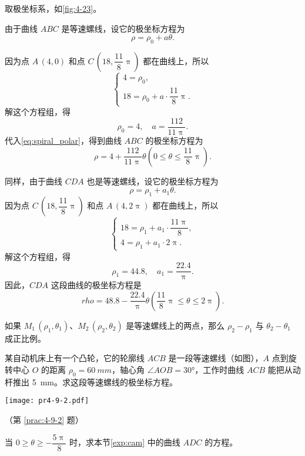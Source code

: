 \begin{solution}
  取极坐标系，如\cref{fig:4-23}。

  由于曲线 $ABC$ 是等速螺线，设它的极坐标方程为
  \begin{equation}
    \label{eq:spiral_polar}
    \rho = \rho_0+a\theta.
  \end{equation}
  
  因为点 $A\,(4,0)$ 和点 $C\,\left(18,\dfrac{11}{8}\uppi\right)$ 都在曲线上，所以
  \[\begin{cases}4=\rho_0,\\18=\rho_0+a\cdot\dfrac{11}{8}\uppi.\end{cases}\]
  解这个方程组，得
  \[\rho_0=4,\quad a=\frac{112}{11\uppi}.\]
  代入\cref{eq:spiral_polar}，得到曲线 $ABC$ 的极坐标方程为
  \[\rho=4+\frac{112}{11\uppi}\theta \left(0\leqslant\theta\leqslant\frac{11}{8}\uppi\right).\]
  
  同样，由于曲线 $CDA$ 也是等速螺线，设它的极坐标方程为
  \begin{equation}
    \label{eq:spiral_polar_2}
    \rho = \rho_1+a_1\theta.
  \end{equation}
  因为点 $C\,\left(18,\dfrac{11}{8}\uppi\right)$ 和点 $A\,(4,2\uppi)$ 都在曲线上，所以
  \[\begin{cases}18=\rho_1+a_1\cdot\dfrac{11\uppi}{8},\\4=\rho_1+a_1\cdot 2\uppi.\end{cases}\]
  解这个方程组，得
  \[\rho_1=44.8,\quad a_1=\frac{22.4}{\uppi}.\]
  因此，$CDA$ 这段曲线的极坐标方程是
  \[rho=48.8-\frac{22.4}{\uppi}\theta \left(\frac{11}{8}\uppi\leqslant\theta \leqslant 2\uppi\right).\]
\end{solution}

\begin{Practice}
  \begin{question}
    \item 如果 $M_1\,(\rho_1,\theta_1)$、$M_2\,(\rho_2,\theta_2)$ 是等速螺线上的两点，那么 $\rho_2-\rho_1$ 与 $\theta_2-\theta_1$ 成正比例。
    \item\label{prac:4-9-2} 
    某自动机床上有一个凸轮，它的轮廓线 $ACB$ 是一段等速螺线（如图），$A$ 点到旋转中心 $O$ 的距离 $\rho_0= \qty{60}{mm}$，轴心角 $\angle AOB= \ang{30}$，工作时曲线 $ACB$ 能把从动杆推出 \qty{5}{mm}。求这段等速螺线的极坐标方程。
    \begin{figurehere}
      \begin{minipage}{\linewidth}\centering
        \texttt{[image: pr4-9-2.pdf]}
        \caption*{（第 \ref{prac:4-9-2} 题）}
      \end{minipage}
    \end{figurehere}
    \item 当 $0\geqslant\theta\geqslant-\dfrac{5\uppi}{8}$ 时，求本节\cref{exp:cam} 中的曲线 $ADC$ 的方程。
  \end{question}
\end{Practice}

